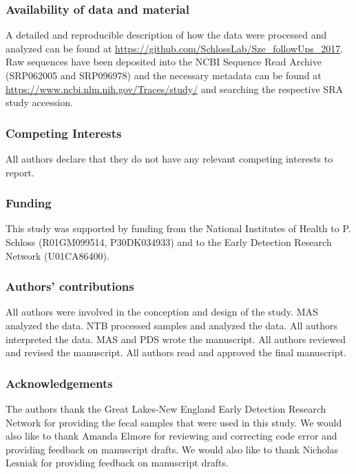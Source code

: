 \documentclass[12pt,]{article}
\begin{document}
\subsubsection{Availability of data and
material}\label{availability-of-data-and-material}

A detailed and reproducible description of how the data were processed
and analyzed can be found at
\url{https://github.com/SchlossLab/Sze_followUps_2017}. Raw sequences
have been deposited into the NCBI Sequence Read Archive (SRP062005 and
SRP096978) and the necessary metadata can be found at
\url{https://www.ncbi.nlm.nih.gov/Traces/study/} and searching the
respective SRA study accession.

\subsubsection{Competing Interests}\label{competing-interests}

All authors declare that they do not have any relevant competing
interests to report.

\subsubsection{Funding}\label{funding}

This study was supported by funding from the National Institutes of
Health to P. Schloss (R01GM099514, P30DK034933) and to the Early
Detection Research Network (U01CA86400).

\subsubsection{Authors' contributions}\label{authors-contributions}

All authors were involved in the conception and design of the study. MAS
analyzed the data. NTB processed samples and analyzed the data. All
authors interpreted the data. MAS and PDS wrote the manuscript. All
authors reviewed and revised the manuscript. All authors read and
approved the final manuscript.

\subsubsection{Acknowledgements}\label{acknowledgements}

The authors thank the Great Lakes-New England Early Detection Research
Network for providing the fecal samples that were used in this study. We
would also like to thank Amanda Elmore for reviewing and correcting code
error and providing feedback on manuscript drafts. We would also like to
thank Nicholas Lesniak for providing feedback on manuscript drafts.
\end{document}

